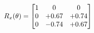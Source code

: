 \documentclass[preview]{standalone}
\begin{document}
\begin{align*}
\special{dvisvgm:raw <g id='unique000'>}R_{x}(\theta) = \begin{bmatrix}1 & 0 & 0 \\0 & +0.67 & +0.74 \\0 & -0.74 & +0.67\end{bmatrix}\special{dvisvgm:raw </g>}
\end{align*}
\end{document}
